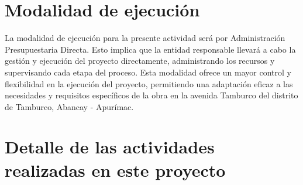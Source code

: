 \section{Modalidad de ejecución}
La modalidad de ejecución para la presente actividad será por Administración Presupuestaria Directa. Esto implica que la entidad responsable llevará a cabo la gestión y ejecución del proyecto directamente, administrando los recursos y supervisando cada etapa del proceso. Esta modalidad ofrece un mayor control y flexibilidad en la ejecución del proyecto, permitiendo una adaptación eficaz a las necesidades y requisitos específicos de la obra en la avenida Tamburco del distrito de Tamburco, Abancay - Apurímac.

\section{Detalle de las actividades realizadas en este proyecto}

